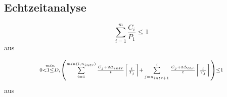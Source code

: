 \subsection{Echtzeitanalyse}
\label{sec:Echtzeitanalyse} 
\begin{equation}
	\scriptstyle 
		\sum \limits_{i=1}^m\frac{C_i}{P_1}\leq 1
\label{eq:scheduable1}
\end{equation}
aus \cite{9783827373427}


\begin{equation}
\scriptstyle 
	 \stackrel{min}{0 < 1 \leq D_i}\left(\sum \limits_{i=1}^{min(i,n_{intr})}\frac{C_j + 2\Delta_{intr}}{t}\left\lceil \frac{t}{T_j}\right\rceil+\\
	\sum \limits_{j=n_{intr+1}}^{i}\frac{C_j + 2\Delta_{thr}}{t}\left\lceil \frac{t}{T_j}\right\rceil\right)\leq 1
	\label{eq:scheduable2}
\end{equation}
aus \cite{RealTimePerformance}

